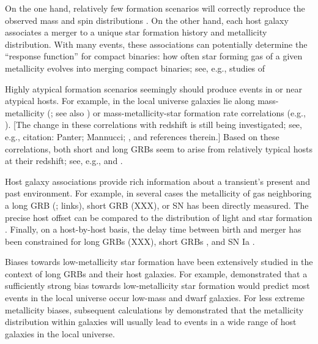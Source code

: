 \documentclass[nofootinbib,twocolumn,prd]{emulateapj}
\newcommand\editremark[1]{{\color{red}#1}}
\begin{document}
On the one hand,  relatively few formation scenarios will correctly reproduce the observed mass and spin distributions
\citep{2004MNRAS.352.1372B,2003ApJ...589L..37B,gwastro-Ilya-ConfProc-NRDA-2010}.  
On the other hand, each host galaxy associates a merger to a unique star formation history and metallicity distribution.
With many events, these associations can potentially determine the ``response function'' for compact binaries: how often star forming gas of a given metallicity evolves into
merging compact binaries;  see, e.g., studies of

%
Highly atypical formation scenarios seemingly should produce events in or near atypical hosts.  
For example, in the local universe galaxies lie along mass-metallicity  (\cite{2004ApJ...613..898T}; see also
\cite{sfr-ZEvolution-ByGalaxy-Panter2008})
or mass-metallicity-star formation rate  correlations (e.g., \cite{2010MNRAS.408.2115M}).
[The change in these correlations with redshift is still being investigated; see, e.g., \editremark{citation: Panter;
    Mannucci; }, \cite{2011ApJ...739....1L} and references therein.]
Based on these correlations, both short  and long GRBs seem to arise from
relatively typical hosts at their redshift; see, e.g., \cite{grb-short-Hosts-Berger2008} and \cite{grb-long-HostMetallicityVsTrend-Mannucci2010}.


Host galaxy associations provide rich information about a transient's present and past environment.
%
For example, in several cases the metallicity of gas neighboring a long GRB (\citet{ 2008AJ....135.1136M}; \citet{2010AJ....140.1557L}
\editremark{links}), short GRB (\editremark{XXX}), or SN has been directly measured.
%
The precise host offset can be compared to the distribution of light and star formation  \citep{2010ApJ...708....9F}.
%
Finally,  on a host-by-host basis, the delay time between birth and merger has been constrained for long GRBs (\editremark{XXX}), short GRBs \citep{2010ApJ...725.1202L}, and
  SN Ia \citep{2011MNRAS.412.1508M}.
%



Biases towards low-metallicity star formation have been extensively studied in the context of long GRBs and their host galaxies.
%
For example, \cite{2009ApJ...702..377K} demonstrated that a sufficiently strong bias towards low-metallicity star formation would predict
most  events in the local universe occur low-mass and dwarf galaxies.
For less extreme metallicity biases, subsequent calculations by  \citet{2011MNRAS.417..567N} demonstrated that the
metallicity distribution within galaxies will usually lead to events in a wide range of host galaxies in the local universe.
\end{document}
